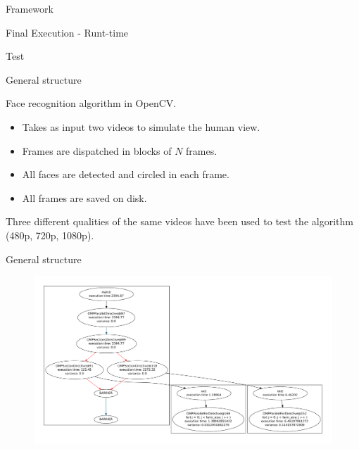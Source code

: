 \documentclass[xcolor=dvipsnames]{beamer}
\begin{document}
\begin{section}{Framework}
\begin{frame}{\hskip 0.3cm Final Execution - Runt-time}
\end{frame}











\end{section}
\begin{section}{Test}











\begin{frame}{\hskip 0.3cm General structure}

Face recognition algorithm in OpenCV.

\begin{itemize}

\item Takes as input two videos to simulate the human view.

\item Frames are dispatched in blocks of $N$ frames.
 
\item All faces are detected and circled in each frame.

\item All frames are saved on disk.


\end{itemize}

Three different qualities of the same videos have been used to test the algorithm (480p, 720p, 1080p).


\end{frame}
















\begin{frame}{\hskip 0.3cm General structure}

\vskip -1cm

\begin{figure}
\hskip -1cm

\includegraphics[scale=0.23]{test.pdf}
\end{figure}


\end{frame}
\end{section}
\end{document}
